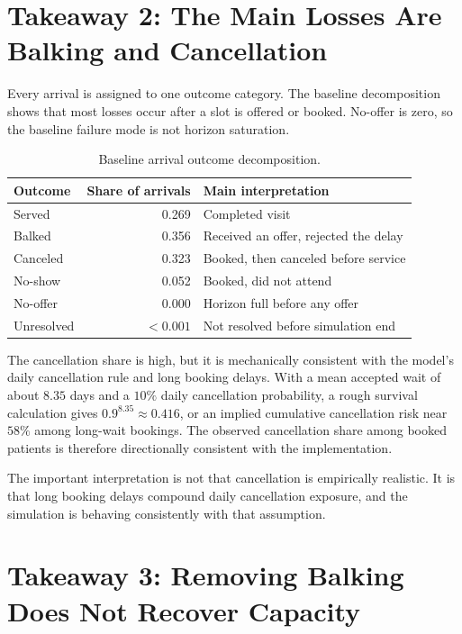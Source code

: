 \documentclass[11pt]{article}
\begin{document}
\section{Takeaway 2: The Main Losses Are Balking and Cancellation}

Every arrival is assigned to one outcome category. The baseline decomposition
shows that most losses occur after a slot is offered or booked. No-offer is
zero, so the baseline failure mode is not horizon saturation.

\begin{table}[h]
\centering
\small
\renewcommand{\arraystretch}{1.12}
\begin{tabularx}{0.92\textwidth}{Yrl}
\toprule
Outcome & Share of arrivals & Main interpretation \\
\midrule
Served & 0.269 & Completed visit \\
Balked & 0.356 & Received an offer, rejected the delay \\
Canceled & 0.323 & Booked, then canceled before service \\
No-show & 0.052 & Booked, did not attend \\
No-offer & 0.000 & Horizon full before any offer \\
Unresolved & \(<0.001\) & Not resolved before simulation end \\
\bottomrule
\end{tabularx}
\caption{Baseline arrival outcome decomposition.}
\end{table}

The cancellation share is high, but it is mechanically consistent with the
model's daily cancellation rule and long booking delays. With a mean accepted
wait of about \(8.35\) days and a \(10\%\) daily cancellation probability, a
rough survival calculation gives \(0.9^{8.35}\approx0.416\), or an implied
cumulative cancellation risk near \(58\%\) among long-wait bookings. The
observed cancellation share among booked patients is therefore directionally
consistent with the implementation.

The important interpretation is not that cancellation is empirically realistic.
It is that long booking delays compound daily cancellation exposure, and the
simulation is behaving consistently with that assumption.

\section{Takeaway 3: Removing Balking Does Not Recover Capacity}
\end{document}
